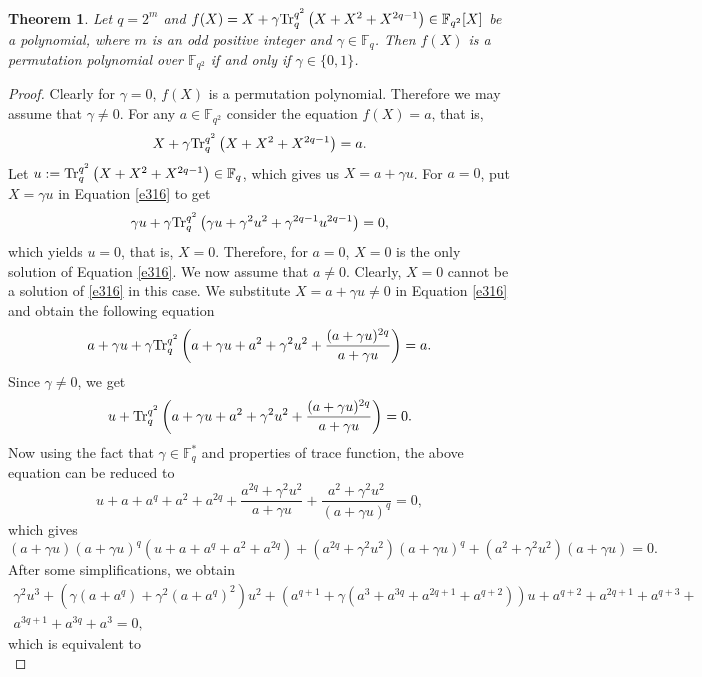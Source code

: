 \documentclass[11pt]{amsart}
\theoremstyle{plain}
\newtheorem{thm}{Theorem}[section]
\numberwithin{equation}{section}
\theoremstyle{definition}
\newcommand{\F}{\mathbb F}
\def\Tr{{\rm Tr}}
\begin{document}
\begin{thm}\label{T32}
    Let $q=2^m$ and $f(X)=X+\gamma \Tr_{q}^{q^2}\left(X+X^2+X^{2q-1}\right) \in \F_{q^2}[X]$ be a polynomial, where $m$ is an odd positive integer and $\gamma \in \F_q$. Then $f(X)$ is a permutation polynomial over $\F_{q^2}$ if and only if $\gamma \in \{0,1\}$.
    \end{thm}
\begin{proof} Clearly for $\gamma=0$, $f(X)$ is a permutation polynomial. Therefore we may assume that $\gamma \neq 0$. For any $a \in \F_{q^2}$ consider the equation $f(X)=a$, that is,
\begin{equation}\label{e316}
X+\gamma \Tr_{q}^{q^2}\left(X+X^2+X^{2q-1}\right)=a.
\end{equation} 
 Let $u:=\Tr_{q}^{q^2}\left(X+X^2+X^{2q-1}\right) \in \F_q$, which gives us $X=a+\gamma u$. 
For $a=0$, put $X=\gamma u$ in Equation \eqref{e316} to get 
\[
\gamma u+\gamma \Tr_{q}^{q^2}\left(\gamma u +\gamma^2 u^2+\gamma^{2q-1}u^{2q-1}\right)=0, 
\]
which yields $u=0$, that is, $X=0$. Therefore, for $a=0$, $X=0$ is the only solution of Equation \eqref{e316}. We now assume that $a\neq 0$. Clearly, $X=0$ cannot be a solution of \eqref{e316} in this case. We substitute $X=a+\gamma u \neq 0$ in Equation \eqref{e316} and obtain the following equation
\[
a+\gamma u+\gamma \Tr_{q}^{q^2}\left(a+\gamma u+a^2+\gamma^2 u^2+\frac{(a+\gamma u)^{2q}}{a+\gamma u}\right)=a.
\]
Since $\gamma \neq 0$, we get
\[
u+\Tr_{q}^{q^2}\left(a+\gamma u+a^2+\gamma^2 u^2+\frac{(a+\gamma u)^{2q}}{a+\gamma u}\right)=0.
\]
Now using the fact that  $\gamma \in \F_q^{*}$ and properties of trace function, the above equation can be reduced to
\[
u+a+a^{q}+a^2+a^{2q}+\frac{a^{2q}+\gamma^2u^2}{a+\gamma u}+\frac{a^2+\gamma^2u^2}{(a+\gamma u)^q}=0,
\]
which gives 
\[
(a+\gamma u)(a+\gamma u)^q(u+a+a^q+a^2+a^{2q})+(a^{2q}+\gamma^2u^2)(a+\gamma u)^q+(a^2+\gamma^2u^2)(a+\gamma u)=0.
\]
After some simplifications, we obtain
\begin{equation*}
\begin{split}
     \gamma^2 u^3+(\gamma(a+a^q)+\gamma^2(a+a^q)^2)u^2+\left(a^{q+1}+\gamma(a^3+a^{3q}+a^{2q+1}+a^{q+2})\right)u+a^{q+2}+a^{2q+1}+a^{q+3}+\\
     a^{3q+1}+a^{3q}+a^3=0, 
    \end{split}
\end{equation*}
which is equivalent to 
\begin{equation}\label{e317}

\end{equation}
\end{proof}
\end{document}
